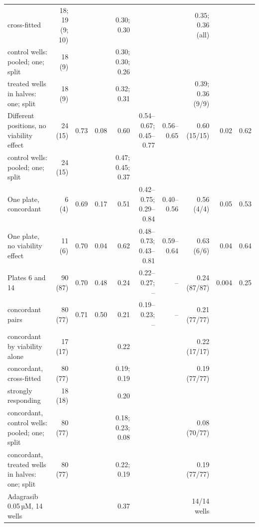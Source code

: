 \begin{table}[!htbp]
{\begin{minipage}{183mm}
\begin{tabular}{@{}>{\raggedright\arraybackslash}p{34mm}rrrrrrrrr@{}}
\quad cross-fitted & 18; 19 (9; 10) & & & 0.30; 0.30 & & & 0.35; 0.36 (all) & & \\
\quad control wells: pooled; one; split & 18 (9) & & & 0.30; 0.30; 0.26 & & & & & \\
\quad treated wells in halves: one; split & 18 (9) & & & 0.32; 0.31 & & & 0.39; 0.36 (9/9) & & \\
Different positions, no viability effect & 24 (15) & 0.73 & 0.08 & 0.60 & 0.54--0.67; 0.45--0.77 & 0.56--0.65 & 0.60 (15/15) & 0.02 & 0.62 \\
\quad control wells: pooled; one; split & 24 (15) & & & 0.47; 0.45; 0.37 & & & & & \\
One plate, concordant & 6 (4) & 0.69 & 0.17 & 0.51 & 0.42--0.75; 0.29--0.84 & 0.40--0.56 & 0.56 (4/4) & 0.05 & 0.53 \\
One plate, no viability effect & 11 (6) & 0.70 & 0.04 & 0.62 & 0.48--0.73; 0.43--0.81 & 0.59--0.64 & 0.63 (6/6) & 0.04 & 0.64 \\
Plates 6 and 14 & 90 (87) & 0.70 & 0.48 & 0.24 & 0.22--0.27; -- & -- & 0.24 (87/87) & 0.004 & 0.25 \\
\quad concordant pairs & 80 (77) & 0.71 & 0.50 & 0.21 & 0.19--0.23; -- & -- & 0.21 (77/77) & & \\
\quad concordant by viability alone & 17 (17) & & & 0.22 & & & 0.22 (17/17) & & \\
\quad concordant, cross-fitted & 80 (77) & & & 0.19; 0.19 & & & 0.19 (77/77) & & \\
\quad strongly responding & 18 (18) & & & 0.20 & & & & & \\
\quad concordant, control wells: pooled; one; split & 80 (77) & & & 0.18; 0.23; 0.08 & & & 0.08 (70/77) & & \\
\quad concordant, treated wells in halves: one; split & 80 (77) & & & 0.22; 0.19 & & & 0.19 (77/77) & & \\
Adagrasib 0.05\,µM, 14 wells & & & & 0.37 & & & 14/14 wells & & \\
\bottomrule\end{tabular}
\end{minipage}}
\makebox[\textwidth][c]{\usebox{\tbox}}
\end{table}

